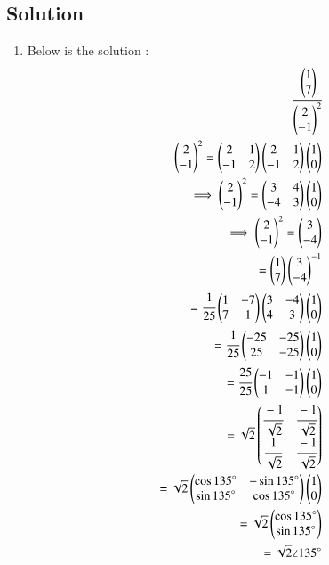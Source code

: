 \begin{enumerate}[label=\thesection.\arabic*.,ref=\thesection.\theenumi]
\section{Solution}
\begin{enumerate}
    \item Below is the solution :
\begin{align}
    \cfrac{\begin{pmatrix}1 \\ 7\end{pmatrix}}{\begin{pmatrix}2 \\ -1\end{pmatrix}^{2}}
\\
    \begin{pmatrix}2 \\ -1\end{pmatrix}^2 = \begin{pmatrix}2 & 1\\-1 & 2\end{pmatrix}\begin{pmatrix}2 & 1\\-1 & 2\end{pmatrix}\begin{pmatrix}1 \\ 0\end{pmatrix}
\\
    \implies \begin{pmatrix}2 \\ -1\end{pmatrix}^2 = \begin{pmatrix}3 & 4\\-4 & 3\end{pmatrix}\begin{pmatrix}1 \\ 0\end{pmatrix}
\\
    \implies \begin{pmatrix}2 \\ -1\end{pmatrix}^2 = \begin{pmatrix}3 \\-4\end{pmatrix}
\\
    =\begin{pmatrix}1 \\ 7\end{pmatrix}\begin{pmatrix}3\\-4\end{pmatrix}^{-1}
\\
    =\cfrac{1}{25}\begin{pmatrix}1 & -7\\7 & 1\end{pmatrix}\begin{pmatrix}3 & -4\\4 & 3\end{pmatrix}\begin{pmatrix}1 \\ 0\end{pmatrix}
\\
    =\cfrac{1}{25}\begin{pmatrix}-25 & -25\\25 & -25\end{pmatrix}\begin{pmatrix}1 \\ 0\end{pmatrix}
\\
    =\cfrac{25}{25}\begin{pmatrix}-1 & -1\\1 & -1\end{pmatrix}\begin{pmatrix}1 \\ 0\end{pmatrix}
\\
    =\sqrt{2}\begin{pmatrix}\cfrac{-1}{\sqrt{2}} & \cfrac{-1}{\sqrt{2}} \\ \cfrac{1}{\sqrt{2}} & \cfrac{-1}{\sqrt{2}}\end{pmatrix}
\\
    =\sqrt{2}\begin{pmatrix}\cos{135}\degree & -\sin{135}\degree\\ \sin{135}\degree & \cos{135}\degree\end{pmatrix}\begin{pmatrix}1 \\ 0\end{pmatrix}
\\
    =\sqrt{2}\begin{pmatrix}\cos{135}\degree \\ \sin{135}\degree\end{pmatrix}
\\
    =\sqrt{2} \angle 135 \degree
\end{align}

\end{enumerate}
\end{enumerate}
